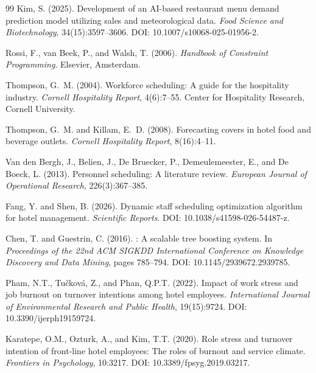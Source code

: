\documentclass[12pt,a4paper,oneside]{article}
\begin{document}
\begin{thebibliography}{99}
Kim, S. (2025).
\newblock Development of an {AI}-based restaurant menu demand prediction model
  utilizing sales and meteorological data.
\newblock \textit{Food Science and Biotechnology}, 34(15):3597--3606.
\newblock DOI: 10.1007/s10068-025-01956-2.

Rossi, F., van Beek, P., and Walsh, T. (2006).
\newblock \textit{Handbook of Constraint Programming}.
\newblock Elsevier, Amsterdam.

Thompson, G.~M. (2004).
\newblock Workforce scheduling: A guide for the hospitality industry.
\newblock \textit{Cornell Hospitality Report}, 4(6):7--55.
\newblock Center for Hospitality Research, Cornell University.

Thompson, G.~M. and Killam, E.~D. (2008).
\newblock Forecasting covers in hotel food and beverage outlets.
\newblock \textit{Cornell Hospitality Report}, 8(16):4--11.

Van den Bergh, J., Belien, J., De Bruecker, P., Demeulemeester, E., and De Boeck, L. (2013).
\newblock Personnel scheduling: A literature review.
\newblock \textit{European Journal of Operational Research}, 226(3):367--385.

Fang, Y. and Shen, B. (2026).
\newblock Dynamic staff scheduling optimization algorithm for hotel management.
\newblock \textit{Scientific Reports}.
\newblock DOI: 10.1038/s41598-026-54487-z.

Chen, T. and Guestrin, C. (2016).
: A scalable tree boosting system.
\newblock In \textit{Proceedings of the 22nd ACM SIGKDD International Conference on Knowledge Discovery and Data Mining}, pages 785--794.
\newblock DOI: 10.1145/2939672.2939785.

Pham, N.T., Tučková, Z., and Phan, Q.P.T. (2022).
\newblock Impact of work stress and job burnout on turnover intentions among hotel employees.
\newblock \textit{International Journal of Environmental Research and Public Health}, 19(15):9724.
\newblock DOI: 10.3390/ijerph19159724.

Karatepe, O.M., Ozturk, A., and Kim, T.T. (2020).
\newblock Role stress and turnover intention of front-line hotel employees: The roles of burnout and service climate.
\newblock \textit{Frontiers in Psychology}, 10:3217.
\newblock DOI: 10.3389/fpsyg.2019.03217.


\end{thebibliography}
\end{document}
